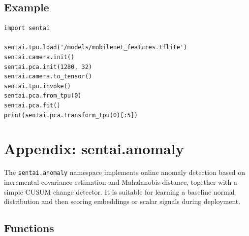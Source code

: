 \subsection{Example}\label{example-17}

\begin{verbatim}
import sentai

sentai.tpu.load('/models/mobilenet_features.tflite')
sentai.camera.init()
sentai.pca.init(1280, 32)
sentai.camera.to_tensor()
sentai.tpu.invoke()
sentai.pca.from_tpu(0)
sentai.pca.fit()
print(sentai.pca.transform_tpu(0)[:5])
\end{verbatim}

\section{Appendix: sentai.anomaly}\label{appendix-sentai.anomaly}

The \texttt{sentai.anomaly} namespace implements online anomaly
detection based on incremental covariance estimation and Mahalanobis
distance, together with a simple CUSUM change detector. It is suitable
for learning a baseline normal distribution and then scoring embeddings
or scalar signals during deployment.

\subsection{Functions}\label{functions-18}

